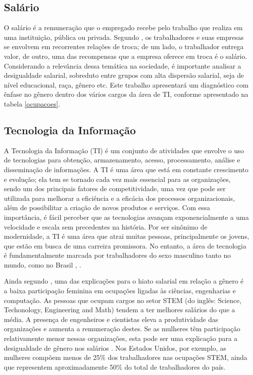 \subsection{Salário}

O salário é a remuneração que o empregado recebe pelo trabalho que realiza em uma instituição, pública ou privada. Segundo \cite{kryscynski2021firm}, os trabalhadores e suas empresas se envolvem em recorrentes relações de troca; de um lado, o trabalhador entrega valor, de outro, uma das recompensas que a empresa oferece em troca é o salário.
Considerando a relevância dessa temática na sociedade, é importante analisar a 
 desigualdade salarial, sobreduto entre grupos com alta dispersão salarial, seja de nível educacional, raça, gênero etc. Este trabalho apresentará um diagnóstico com ênfase no gênero dentro dos vários cargos da área de TI, conforme apresentado na tabela \ref{ocupacoes}.

 \subsection{Tecnologia da Informação}

A Tecnologia da Informação (TI) é um conjunto de atividades que envolve o uso de tecnologias para obtenção, armazenamento, acesso, processamento, análise e disseminação de informações. A TI é uma área que está em constante crescimento e evolução; ela tem se tornado cada vez mais essencial para as organizações, sendo um dos principais fatores de competitividade, uma vez que pode ser utilizada para melhorar a eficiência e a eficácia dos processos  organizacionais, além de possibilitar a criação de novos produtos e serviços. Com essa importância, é fácil perceber que as tecnologias avançam exponencialmente a uma velocidade e escala sem precedentes na história. Por ser sinônimo de modernidade, a TI é uma área que atrai muitas pessoas, principalmente os jovens, que estão em busca de uma carreira promissora. No entanto, a área de tecnologia é fundamentalmente marcada por trabalhadores do sexo masculino tanto no mundo, como no Brasil \cite{de2021evidencias}, \cite{nunes2016genero}.

Ainda segundo \cite{de2021evidencias}, uma das explicações para o hiato salarial em relação a gênero é a baixa participação feminina em ocupações ligadas às ciências, engenharias e computação. As pessoas que ocupam cargos no setor STEM (do inglês: Science, Techonology, Engineering and Math) tendem a ter melhores salários do que a média. A presença de engenheiros e cientistas eleva a produtividade das organizações e aumenta a remuneração destes. Se as mulheres têm participação relativamente menor nessas organizações, esta pode ser uma explicação para a desigualdade de gênero nos salários \cite{barth2017effects}. Nos Estados Unidos, por exemplo, as mulheres compõem menos de 25\% dos trabalhadores nas ocupações STEM, ainda que representem aproximadamente 50\% do total de trabalhadores do país.